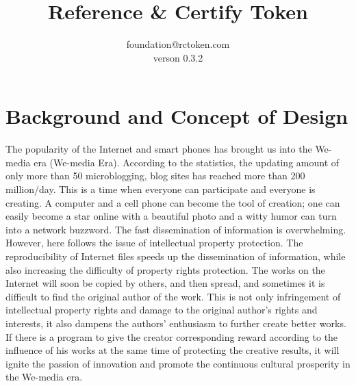 \documentclass[a4paper,oneside,openany]{tufte-book}
\title{Reference \& Certify Token}
\author{foundation@rctoken.com \\ verson 0.3.2}
\begin{document}
\maketitle
\tableofcontents


































\chapter{Background and Concept of Design}

The popularity of the Internet and smart phones has brought us into the We-media era (We-media Era). According to the statistics, the updating amount of only more than 50 microblogging, blog sites has reached more than 200 million/day. This is a time when everyone can participate and everyone is creating. A computer and a cell phone can become the tool of creation; one can easily become a star online with a beautiful photo and a witty humor can turn into a network buzzword. The fast dissemination of information is overwhelming. However, here follows the issue of intellectual property protection. The reproducibility of Internet files speeds up the dissemination of information, while also increasing the difficulty of property rights protection. The works on the Internet will soon be copied by others, and then spread, and sometimes it is difficult to find the original author of the work. This is not only infringement of intellectual property rights and damage to the original author's rights and interests, it also dampens the authors' enthusiasm to further create better works. If there is a program to give the creator corresponding reward according to the influence of his works at the same time of protecting the creative results, it will ignite the passion of innovation and promote the continuous cultural prosperity in the We-media era.    
\end{document}
